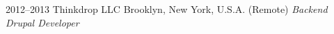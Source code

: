 \documentclass[]{friggeri-cv} %
\begin{document}
\begin{entrylist}
{%
}
\entry
{2012--2013}
{Thinkdrop LLC}
{Brooklyn, New York, U.S.A. (Remote)}
{ \emph{Backend Drupal Developer }
}
 \end{entrylist}
\end{document}

